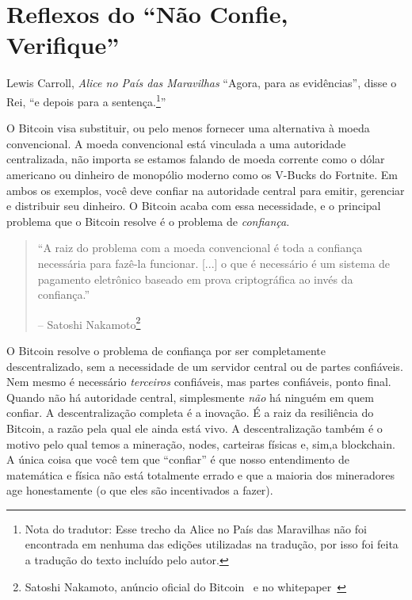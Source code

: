 \chapter{Reflexos do \enquote{Não Confie, Verifique}}
\label{les:16}

\begin{chapquote}{Lewis Carroll, \textit{Alice no País das Maravilhas}}
\enquote{Agora, para as evidências}, disse o Rei, \enquote{e depois para a sentença.\footnote{Nota do tradutor: Esse trecho da Alice no País das Maravilhas não foi encontrada em nenhuma das edições utilizadas na tradução, por isso foi feita a tradução do texto incluído pelo autor.}}
\end{chapquote}

O Bitcoin visa substituir, ou pelo menos fornecer uma alternativa à moeda convencional. A moeda convencional está vinculada a uma autoridade centralizada, não importa se estamos falando de moeda corrente como o dólar americano ou dinheiro de monopólio moderno como os V-Bucks do Fortnite. Em ambos os exemplos, você deve confiar na autoridade central para emitir, gerenciar e distribuir seu dinheiro. O Bitcoin acaba com essa necessidade, e o principal problema que o Bitcoin resolve é o problema de \textit{confiança}.

\begin{quotation}\begin{samepage}
\enquote{A raiz do problema com a moeda convencional é toda a confiança necessária para fazê-la funcionar. [...] o que é necessário é um sistema de pagamento eletrônico baseado em prova criptográfica ao invés da confiança.}
\begin{flushright} -- Satoshi Nakamoto\footnote{Satoshi Nakamoto, anúncio oficial do Bitcoin~\cite{bitcoin-announcement} e no whitepaper~\cite{whitepaper}}
\end{flushright}\end{samepage}\end{quotation}

O Bitcoin resolve o problema de confiança por ser completamente descentralizado, sem a necessidade de um servidor central ou de partes confiáveis. Nem mesmo é necessário \textit{terceiros} confiáveis, mas partes confiáveis, ponto final. Quando não há autoridade central, simplesmente \textit{não} há ninguém em quem confiar. A descentralização completa é a inovação. É a raiz da resiliência do Bitcoin, a razão pela qual ele ainda está vivo. A descentralização também é o motivo pelo qual temos a mineração, nodes, carteiras físicas e, sim,a blockchain. A única coisa que você tem que \enquote{confiar} é que nosso entendimento de matemática e física não está totalmente errado e que a maioria dos mineradores age honestamente (o que eles são incentivados a fazer).

